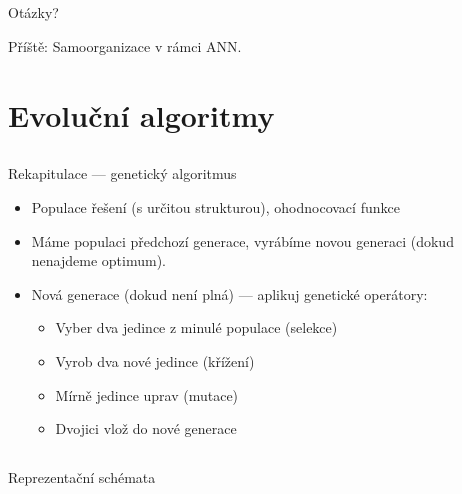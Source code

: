 \documentclass{beamer}
\begin{document}
\subsection{}
\begin{frame}{Otázky?}
\begin{center}
Příště: Samoorganizace v rámci ANN.
\end{center}
\end{frame}

\section{Evoluční algoritmy}

\subsection{}
\begin{frame}{Rekapitulace --- genetický algoritmus}
\begin{itemize}
\item Populace řešení (s určitou strukturou), ohodnocovací funkce
\item Máme populaci předchozí generace, vyrábíme novou generaci (dokud nenajdeme optimum).
\item Nová generace (dokud není plná) --- aplikuj genetické operátory:
\begin{itemize}
\item Vyber dva jedince z minulé populace (selekce)
\item Vyrob dva nové jedince (křížení)
\item Mírně jedince uprav (mutace)
\item Dvojici vlož do nové generace
\end{itemize}
\end{itemize}
\end{frame}

\subsection{}
\begin{frame}{Reprezentační schémata}
\end{frame}
\end{document}
